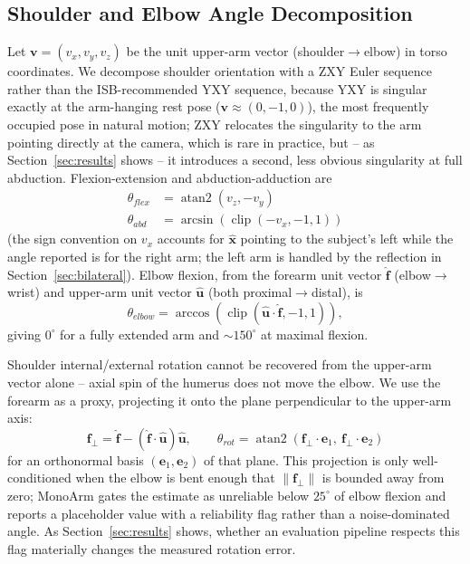 \documentclass[conference]{IEEEtran}
\begin{document}
\subsection{Shoulder and Elbow Angle Decomposition}
\label{sec:angles}
Let $\mathbf{v} = (v_x, v_y, v_z)$ be the unit upper-arm vector
(shoulder$\to$elbow) in torso coordinates. We decompose shoulder
orientation with a ZXY Euler sequence rather than the ISB-recommended
YXY sequence, because YXY is singular exactly at the arm-hanging rest
pose ($\mathbf{v}\approx(0,-1,0)$), the most frequently occupied pose in
natural motion; ZXY relocates the singularity to the arm pointing
directly at the camera, which is rare in practice, but -- as
Section~\ref{sec:results} shows -- it introduces a second, less obvious
singularity at full abduction. Flexion-extension and
abduction-adduction are
\begin{align}
\theta_{flex} &= \operatorname{atan2}(v_z, -v_y) \\
\theta_{abd} &= \arcsin(\operatorname{clip}(-v_x, -1, 1))
\end{align}
(the sign convention on $v_x$ accounts for $\hat{\mathbf{x}}$ pointing to
the subject's left while the angle reported is for the right arm; the
left arm is handled by the reflection in Section~\ref{sec:bilateral}).
Elbow flexion, from the forearm unit vector $\hat{\mathbf{f}}$
(elbow$\to$wrist) and upper-arm unit vector $\hat{\mathbf{u}}$ (both
proximal$\to$distal), is
\begin{equation}
\theta_{elbow} = \arccos(\operatorname{clip}(\hat{\mathbf{u}}\cdot\hat{\mathbf{f}}, -1, 1)),
\end{equation}
giving $0^\circ$ for a fully extended arm and $\sim\!150^\circ$ at
maximal flexion.

Shoulder internal/external rotation cannot be recovered from the
upper-arm vector alone -- axial spin of the humerus does not move the
elbow. We use the forearm as a proxy, projecting it onto the plane
perpendicular to the upper-arm axis:
\begin{equation}
\mathbf{f}_\perp = \hat{\mathbf{f}} - (\hat{\mathbf{f}}\cdot\hat{\mathbf{u}})\hat{\mathbf{u}}, \qquad
\theta_{rot} = \operatorname{atan2}(\mathbf{f}_\perp\!\cdot\!\mathbf{e}_1,\ \mathbf{f}_\perp\!\cdot\!\mathbf{e}_2)
\end{equation}
for an orthonormal basis $(\mathbf{e}_1, \mathbf{e}_2)$ of that plane.
This projection is only well-conditioned when the elbow is bent enough
that $\|\mathbf{f}_\perp\|$ is bounded away from zero; MonoArm gates the
estimate as unreliable below $25^\circ$ of elbow flexion and reports a
placeholder value with a reliability flag rather than a noise-dominated
angle. As Section~\ref{sec:results} shows, whether an evaluation
pipeline respects this flag materially changes the measured rotation
error.
\end{document}
